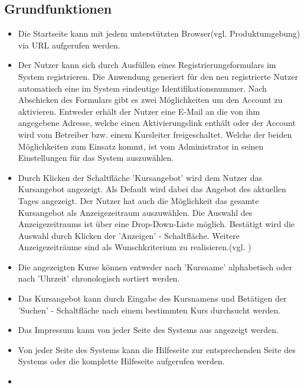 \documentclass[a4paper]{scrreprt}
\begin{document}
		\subsection{Grundfunktionen}
			\begin{itemize}
				\item {}
					Die Startseite kann mit jedem unterstützten Browser(vgl. Produktumgebung) via URL aufgerufen werden.
				\item {}
					Der Nutzer kann sich durch Ausfüllen eines Registrierungsformulars im System registrieren. Die Anwendung generiert für den neu registrierte Nutzer automatisch eine im System eindeutige Identifikationsnummer. Nach Abschicken des Formulars gibt es zwei Möglichkeiten um den Account zu aktivieren. Entweder erhält der Nutzer eine E-Mail an die von ihm angegebene Adresse, welche einen Aktivierungslink enthält oder der Account wird vom Betreiber bzw. einem Kursleiter freigeschaltet. Welche der beiden Möglichkeiten zum Einsatz kommt, ist vom Administrator in seinen Einstellungen für das System auszuwählen.
				\item {}
					Durch Klicken der Schaltfläche 'Kursangebot' wird dem Nutzer das Kursangebot angezeigt. Als Default wird dabei das Angebot des aktuellen Tages angezeigt. Der Nutzer hat auch die Möglichkeit das gesamte Kursangebot als Anzeigezeitraum auszuwählen. Die Auswahl des Anzeigezeitraums ist über eine Drop-Down-Liste möglich. Bestätigt wird die Auswahl durch Klicken der 'Anzeigen' - Schaltfläche. 
					Weitere Anzeigezeiträume sind als Wunschkriterium zu realisieren.(vgl. )
				\item {}
					Die angezeigten Kurse können entweder nach 'Kursname' alphabetisch oder nach 'Uhrzeit' chronologisch sortiert werden.
				\item {}
					Das Kursangebot kann durch Eingabe des Kursnamens  und Betätigen der 'Suchen' - Schaltfläche nach einem bestimmten Kurs durchsucht werden.
				\item {}
					Das Impressum kann von jeder Seite des Systems aus angezeigt werden.
				\item {}
					Von jeder Seite des Systems kann die Hilfeseite zur entsprechenden Seite des Systems oder die komplette Hilfeseite aufgerufen werden.
				\item {}

\end{itemize}
\end{document}
